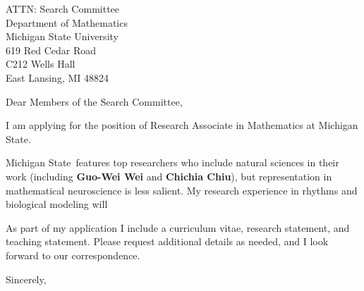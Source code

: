 \documentclass[11pt,a4paper]{letter}
\begin{document}

\def\School{Michigan State}
\begin{letter}
{ATTN: Search Committee\\
Department of Mathematics\\
Michigan State University\\
619 Red Cedar Road\\
C212 Wells Hall\\
East Lansing, MI 48824}


\opening{Dear Members of the Search Committee,}

I am applying for the position of Research Associate in Mathematics at \School. 



\School~features top researchers who include natural sciences in their work (including \textbf{ Guo-Wei Wei} and \textbf{Chichia Chiu}), but representation in mathematical neuroscience is less salient. My research experience in rhythms and biological modeling will 



As part of my application I include a curriculum vitae, research statement, and teaching statement. Please request additional details as needed, and I look forward to our correspondence.

\closing{Sincerely,}
\end{letter}
\end{document}
